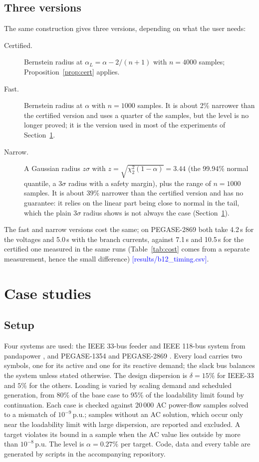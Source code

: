 \documentclass[preprint,12pt]{elsarticle}
\newcommand{\src}[1]{\textcolor{blue}{[#1]}}          %
\begin{document}
\subsection{Three versions}\label{sec:variants}
The same construction gives three versions, depending on what the user needs:
\begin{description}
\item[Certified.] Bernstein radius at $\alpha_L = \alpha - 2/(n+1)$ with $n = 4000$ samples; Proposition~\ref{prop:cert}
applies.
\item[Fast.] Bernstein radius at $\alpha$ with $n = 1000$ samples. It is about 2\% narrower than the certified version
and uses a quarter of the samples, but the level is no longer proved; it is the version used in most of the
experiments of Section~\ref{sec:cases}.
\item[Narrow.] A Gaussian radius $z\sigma$ with $z = \sqrt{\chi^2_2(1-\alpha)} = 3.44$ (the 99.94\% normal quantile, a
$3\sigma$ radius with a safety margin), plus the range of $n = 1000$ samples. It is about 39\% narrower than the
certified version and has no guarantee: it relies on the linear part being close to normal in the tail, which the
plain $3\sigma$ radius shows is not always the case (Section~\ref{sec:cases}).
\end{description}
The fast and narrow versions cost the same; on PEGASE-2869 both take 4.2\,s for the voltages and 5.0\,s with the
branch currents, against 7.1\,s and 10.5\,s for the certified one measured in the same runs (Table~\ref{tab:cost}
comes from a separate measurement, hence the small difference) \src{results/b12\_timing.csv}.

\section{Case studies}\label{sec:cases}

\subsection{Setup}
Four systems are used: the IEEE 33-bus feeder and IEEE 118-bus system from pandapower \cite{thurner2018pandapower},
and PEGASE-1354 and PEGASE-2869 \cite{fliscounakis2013contingency,pglib2019}. Every load carries two symbols, one for
its active and one for its reactive demand; the slack bus balances the system unless stated otherwise. The design
dispersion is $\delta = 15\%$ for IEEE-33 and $5\%$ for the others. Loading is varied by scaling demand and scheduled
generation, from 80\% of the base case to 95\% of the loadability limit found by continuation. Each case is checked
against 20\,000 AC power-flow samples solved to a mismatch of $10^{-9}$\,p.u.; samples without an AC solution, which
occur only near the loadability limit with large dispersion, are reported and excluded. A target violates its bound
in a sample when the AC value lies outside by more than $10^{-8}$\,p.u. The level is $\alpha = 0.27\%$ per target.
Code, data and every table are generated by scripts in the accompanying repository.
\end{document}

